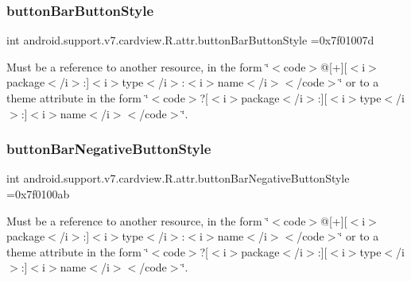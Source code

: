 \subsubsection{\texorpdfstring{button\+Bar\+Button\+Style}{buttonBarButtonStyle}}
{\footnotesize\ttfamily int android.\+support.\+v7.\+cardview.\+R.\+attr.\+button\+Bar\+Button\+Style =0x7f01007d\hspace{0.3cm}{\ttfamily [static]}}

Must be a reference to another resource, in the form \char`\"{}$<$code$>$@\mbox{[}+\mbox{]}\mbox{[}$<$i$>$package$<$/i$>$\+:\mbox{]}$<$i$>$type$<$/i$>$\+:$<$i$>$name$<$/i$>$$<$/code$>$\char`\"{} or to a theme attribute in the form \char`\"{}$<$code$>$?\mbox{[}$<$i$>$package$<$/i$>$\+:\mbox{]}\mbox{[}$<$i$>$type$<$/i$>$\+:\mbox{]}$<$i$>$name$<$/i$>$$<$/code$>$\char`\"{}. \mbox{\label{classandroid_1_1support_1_1v7_1_1cardview_1_1R_1_1attr_a53796ccf1b5a88dc298dfaf30cf3e8db}} 
\subsubsection{\texorpdfstring{button\+Bar\+Negative\+Button\+Style}{buttonBarNegativeButtonStyle}}
{\footnotesize\ttfamily int android.\+support.\+v7.\+cardview.\+R.\+attr.\+button\+Bar\+Negative\+Button\+Style =0x7f0100ab\hspace{0.3cm}{\ttfamily [static]}}

Must be a reference to another resource, in the form \char`\"{}$<$code$>$@\mbox{[}+\mbox{]}\mbox{[}$<$i$>$package$<$/i$>$\+:\mbox{]}$<$i$>$type$<$/i$>$\+:$<$i$>$name$<$/i$>$$<$/code$>$\char`\"{} or to a theme attribute in the form \char`\"{}$<$code$>$?\mbox{[}$<$i$>$package$<$/i$>$\+:\mbox{]}\mbox{[}$<$i$>$type$<$/i$>$\+:\mbox{]}$<$i$>$name$<$/i$>$$<$/code$>$\char`\"{}. \mbox{\label{classandroid_1_1support_1_1v7_1_1cardview_1_1R_1_1attr_ae12477d15a1f3158bd485a520e4096aa}} 
